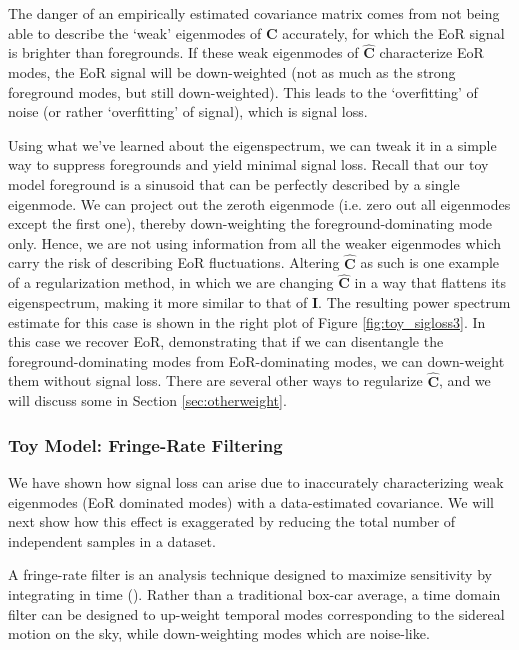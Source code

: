 \documentclass[preprint2,numberedappendix,tighten]{aastex6}  %
\begin{document}
The danger of an empirically estimated covariance matrix comes from not being able to describe the `weak' eigenmodes of $
\textbf{C}$ accurately, for which the EoR signal is brighter than foregrounds. If these weak eigenmodes of $\hat{\textbf{C}}$ 
characterize EoR modes, the EoR signal will be down-weighted (not as much as the strong foreground modes, but still down-weighted). This leads to the `overfitting' of noise (or rather `overfitting' of signal), which is signal loss. 

Using what we've learned about the eigenspectrum, we can tweak it in a simple way to suppress foregrounds and yield minimal 
signal loss. Recall that our toy model foreground is a sinusoid that can be perfectly described by a single eigenmode. We can 
project out the zeroth eigenmode (i.e. zero out all eigenmodes except the first one), thereby down-weighting the foreground-dominating mode only. Hence, we are not using information from all the weaker eigenmodes which carry the risk of 
describing EoR fluctuations. Altering $\hat{\textbf{C}}$ as such is one example of a regularization method, in which we are 
changing $\hat{\textbf{C}}$ in a way that flattens its eigenspectrum, making it more similar to that of $\textbf{I}$. The resulting 
power spectrum estimate for this case is shown in the right plot of Figure \ref{fig:toy_sigloss3}. In this case we recover EoR, 
demonstrating that if we can disentangle the foreground-dominating modes from EoR-dominating modes, we can down-weight 
them without signal loss. There are several other ways to regularize $\hat{\textbf{C}}$, and we will discuss some in Section 
\ref{sec:otherweight}.

\subsubsection{Toy Model: Fringe-Rate Filtering}
\label{sec:toymodel_frf}

We have shown how signal loss can arise due to inaccurately characterizing weak eigenmodes (EoR dominated modes) with a 
data-estimated covariance. We will next show how this effect is exaggerated by reducing the total number of independent 
samples in a dataset. 

A fringe-rate filter is an analysis technique designed to maximize sensitivity by integrating in time (\citealt{parsons_et_al2016}). 
Rather than a traditional box-car average, a time domain filter can be designed to up-weight temporal modes corresponding to 
the sidereal motion on the sky, while down-weighting modes which are noise-like. 
\end{document}
